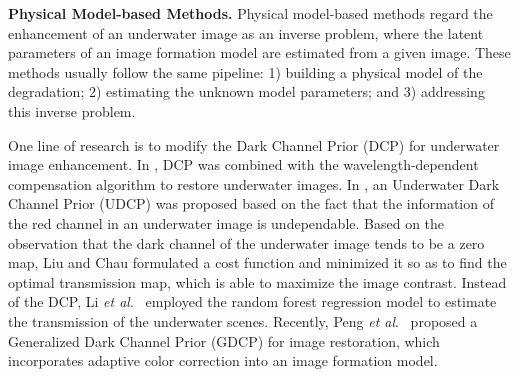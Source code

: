 \documentclass[journal]{IEEEtran}
\newcommand{\etal}{\textit{et al}.}
\begin{document}
\noindent
\textbf{Physical Model-based Methods.} Physical model-based methods regard the enhancement of an underwater image as an inverse problem, where the latent parameters of an image formation model are estimated from a given image.
These methods usually follow the same pipeline: 1) building a physical model of the degradation; 2) estimating the unknown model parameters; and 3) addressing this inverse problem.


One line of research is to modify the Dark Channel Prior (DCP) \cite{He2011} for underwater image enhancement.
In \cite{Chiang2012}, DCP was combined with the wavelength-dependent compensation algorithm to restore underwater images.
In \cite{Drews2016}, an Underwater Dark Channel Prior (UDCP) was proposed based on the fact that the information of the red channel in an underwater image is undependable.
Based on the observation that the dark channel of the underwater image tends to be a zero map, Liu and Chau \cite{Liu2016} formulated a cost function and minimized it so as to find the optimal transmission map, which is able to maximize the image contrast.
Instead of the DCP, Li \etal~\cite{Li2017prl} employed the random forest regression model to estimate the transmission of the underwater scenes.
Recently, Peng \etal~\cite{Peng2018} proposed a Generalized Dark Channel Prior (GDCP) for image restoration, which incorporates adaptive color correction into an image formation model.
\end{document}
